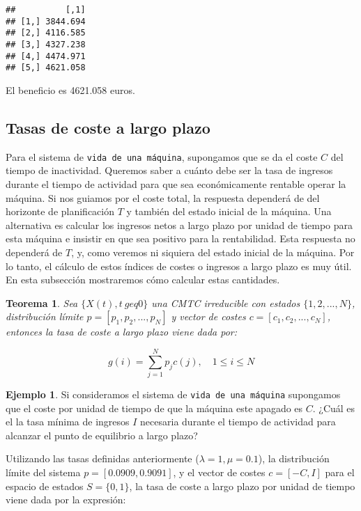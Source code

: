 \documentclass[
]{book}
\newtheorem{theorem}{Teorema}[chapter]
\theoremstyle{definition}
\theoremstyle{definition}
\newtheorem{example}{Ejemplo}[chapter]
\theoremstyle{definition}
\theoremstyle{definition}
\theoremstyle{remark}
\begin{document}
\begin{verbatim}
##          [,1]
## [1,] 3844.694
## [2,] 4116.585
## [3,] 4327.238
## [4,] 4474.971
## [5,] 4621.058
\end{verbatim}

El beneficio es 4621.058 euros.

\hypertarget{tasas-de-coste-a-largo-plazo}{%
\subsection{Tasas de coste a largo plazo}\label{tasas-de-coste-a-largo-plazo}}

Para el sistema de \texttt{vida\ de\ una\ máquina}, supongamos que se da el coste \(C\) del tiempo de inactividad. Queremos saber a cuánto debe ser la tasa de ingresos durante el tiempo de actividad para que sea económicamente rentable operar la máquina. Si nos guiamos por el coste total, la respuesta dependerá de del horizonte de planificación \(T\) y también del estado inicial de la máquina. Una alternativa es calcular los ingresos netos a largo plazo por unidad de tiempo para esta máquina e insistir en que sea positivo para la rentabilidad. Esta respuesta no dependerá de \(T\), y, como veremos ni siquiera del estado inicial de la máquina. Por lo tanto, el cálculo de estos índices de costes o ingresos a largo plazo es muy útil. En esta subsección mostraremos cómo calcular estas cantidades.

\begin{theorem}
Sea \(\{X(t), t \ geq 0\}\) una CMTC irreducible con estados \(\{1, 2,...,N\}\), distribución límite \(p = [p_1, p_2,...,p_N]\) y vector de costes \(c = [c_1, c_2,..., c_N]\), entonces la tasa de coste a largo plazo viene dada por:

\[g(i) = \sum_{j = 1}^N p_jc(j), \quad 1 \leq i \leq N\]
\end{theorem}

\begin{example}
Si consideramos el sistema de \texttt{vida\ de\ una\ máquina} supongamos que el coste por unidad de tiempo de que la máquina este apagado es \(C\). ¿Cuál es el la tasa mínima de ingresos \(I\) necesaria durante el tiempo de actividad para alcanzar el punto de equilibrio a largo plazo?
\end{example}

Utilizando las tasas definidas anteriormente (\(\lambda = 1, \mu = 0.1\)), la distribución límite del sistema \(p = [0.0909, 0.9091]\), y el vector de costes \(c =[-C, I]\) para el espacio de estados \(S = \{0, 1\}\), la tasa de coste a largo plazo por unidad de tiempo viene dada por la expresión:
\end{document}
